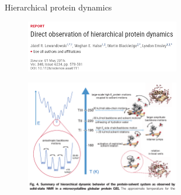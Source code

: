 \documentclass{beamer}
\begin{document}
\begin{frame}{Hierarchical protein dynamics}{}
\begin{figure}
\includegraphics[width=0.6\textwidth]{figures/lewandowski-title.png}{}
\end{figure}
\begin{figure}
\includegraphics[width=0.6\textwidth]{figures/lewandowski-figure.png}
\end{figure}
\end{frame}
\end{document}
